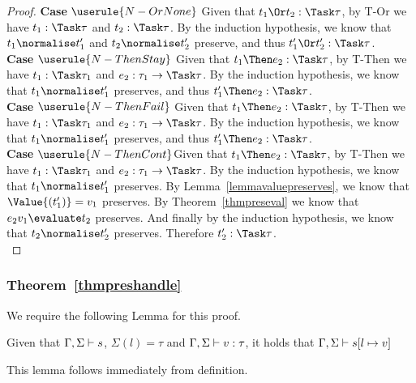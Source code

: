 \begin{proof}
  \noindent\textbf{Case} $\userule{N-OrNone}$ Given that $t_1\Or t_2:\Task\tau$,
  by T-Or we have $t_1:\Task\tau$ and $t_2:\Task\tau$. By the induction hypothesis,
  we know that $t_1\normalise t_1'$ and $t_2\normalise t_2'$ preserve, and thus
  $t_1'\Or t_2':\Task\tau$.\\

  \noindent\textbf{Case} $\userule{N-ThenStay}$ Given that $t_1\Then e_2:\Task\tau$,
  by T-Then we have $t_1:\Task\tau_1$ and $e_2:\tau_1\to\Task\tau$. By the induction
  hypothesis, we know that $t_1\normalise t_1'$ preserves, and thus $t_1'\Then e_2:\Task\tau$.\\

  \noindent\textbf{Case} $\userule{N-ThenFail}$ Given that $t_1\Then e_2:\Task\tau$,
  by T-Then we have $t_1:\Task\tau_1$ and $e_2:\tau_1\to\Task\tau$. By the induction
  hypothesis, we know that $t_1\normalise t_1'$ preserves, and thus $t_1'\Then e_2:\Task\tau$.\\

  \noindent\textbf{Case} $\userule{N-ThenCont}$Given that $t_1\Then e_2:\Task\tau$,
  by T-Then we have $t_1:\Task\tau_1$ and $e_2:\tau_1\to\Task\tau$. By the induction
  hypothesis, we know that $t_1\normalise t_1'$ preserves. By
  Lemma~\ref{lemmavaluepreserves}, we know that $\Value{(t_1')}=v_1$ preserves.
  By Theorem~\ref{thmpreseval} we know that $e_2 v_1\evaluate t_2$ preserves. And
  finally by the induction hypothesis, we know that $t_2\normalise t_2'$ preserves.
  Therefore $t_2':\Task\tau$.\\

\end{proof}


\subsubsection{Theorem~\ref{thmpreshandle}}

We require the following Lemma for this proof.

\begin{lemma}
  Given that $\Gamma,\Sigma\vdash s$, $\Sigma(l)=\tau$ and $\Gamma,\Sigma\vdash v:\tau$, it holds that $\Gamma,\Sigma\vdash s[l\mapsto v]$
  \label{lemmasigmaconsistent}
\end{lemma}
This lemma follows immediately from definition.

